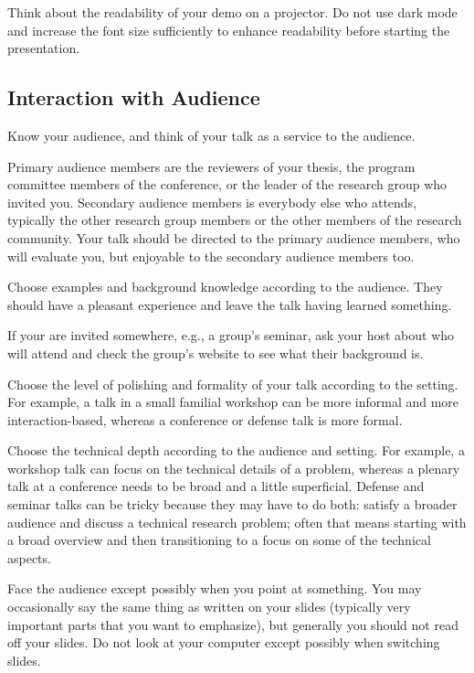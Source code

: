 \documentclass[12pt]{article}
\begin{document}
Think about the readability of your demo on a projector.
Do not use dark mode and increase the font size sufficiently to enhance readability before starting the presentation.

\subsection{Interaction with Audience}

Know your audience, and think of your talk as a service to the audience.
\begin{compactitem}
\item Primary audience members are the reviewers of your thesis, the program committee members of the conference, or the leader of the research group who invited you.
Secondary audience members is everybody else who attends, typically the other research group members or the other members of the research community.
Your talk should be directed to the primary audience members, who will evaluate you, but enjoyable to the secondary audience members too.
\item Choose examples and background knowledge according to the audience. They should have a pleasant experience and leave the talk having learned something.
\item If your are invited somewhere, e.g., a group's seminar, ask your host about who will attend and check the group's website to see what their background is.
\item Choose the level of polishing and formality of your talk according to the setting.
For example, a talk in a small familial workshop can be more informal and more interaction-based, whereas a conference or defense talk is more formal.
\item Choose the technical depth according to the audience and setting. For example, a workshop talk can focus on the technical details of a problem, whereas a plenary talk at a conference needs to be broad and a little superficial.
Defense and seminar talks can be tricky because they may have to do both: satisfy a broader audience and discuss a technical research problem; often that means starting with a broad overview and then transitioning to a focus on some of the technical aspects.
\end{compactitem}

Face the audience except possibly when you point at something.
You may occasionally say the same thing as written on your slides (typically very important parts that you want to emphasize), but generally you should not read off your slides.
Do not look at your computer except possibly when switching slides.
\medskip
\end{document}
